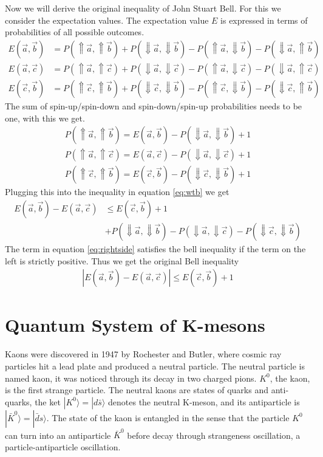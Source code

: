 \documentclass[a4paper]{article}
\begin{document}
Now we will derive the original inequality of John Stuart Bell\cite{bell}.
For this we consider the expectation values. The expectation value $E$ is expressed
in terms of probabilities of all possible outcomes.
\begin{align}
    E(\vec{a}, \vec{b}) &= P(\Uparrow \vec{a}, \Uparrow \vec{b}) + P(\Downarrow
    \vec{a}, \Downarrow \vec{b}) -P(\Uparrow \vec{a}, \Downarrow \vec{b})
    -P(\Downarrow \vec{a}, \Uparrow \vec{b})\\
    E(\vec{a}, \vec{c}) &= P(\Uparrow \vec{a}, \Uparrow \vec{c}) + P(\Downarrow
    \vec{a}, \Downarrow \vec{c}) -P(\Uparrow \vec{a}, \Downarrow \vec{c})
    -P(\Downarrow \vec{a}, \Uparrow \vec{c})\\
    E(\vec{c}, \vec{b}) &= P(\Uparrow \vec{c}, \Uparrow \vec{b}) + P(\Downarrow
    \vec{c}, \Downarrow \vec{b}) -P(\Uparrow \vec{c}, \Downarrow \vec{b})
    -P(\Downarrow \vec{c}, \Uparrow \vec{b})
\end{align}
The sum of spin-up/spin-down and spin-down/spin-up probabilities needs to be
one, with this we get.
\begin{align}
    P(\Uparrow \vec{a}, \Uparrow \vec{b}) = E(\vec{a}, \vec{b}) - P(\Downarrow
    \vec{a}, \Downarrow \vec{b}) + 1\\
    P(\Uparrow \vec{a}, \Uparrow \vec{c}) = E(\vec{a}, \vec{c}) - P(\Downarrow
    \vec{a}, \Downarrow \vec{c}) + 1\\
    P(\Uparrow \vec{c}, \Uparrow \vec{b}) = E(\vec{c}, \vec{b}) - P(\Downarrow
    \vec{c}, \Downarrow \vec{b}) + 1
\end{align}
Plugging this into the inequality in equation \ref{eq:wtb} we get
\begin{align}
    E(\vec{a}, \vec{b}) - E(\vec{a}, \vec{c}) &\leq E(\vec{c}, \vec{b}) + 1\\
    & + P(\Downarrow \vec{a}, \Downarrow \vec{b}) -P(\Downarrow \vec{a},
    \Downarrow \vec{c}) -P(\Downarrow \vec{c}, \Downarrow \vec{b})
    \label{eq:rightside}
\end{align}
The term in equation \ref{eq:rightside} satisfies the bell inequality if the
term on the left is strictly positive. Thus we get the original Bell inequality
\begin{align}
    |E(\vec{a}, \vec{b}) - E(\vec{a}, \vec{c})| \leq E(\vec{c}, \vec{b}) + 1
\end{align}
\section{Quantum System of K-mesons}
Kaons were discovered in 1947 by Rochester and Butler, where cosmic ray
particles hit a lead plate and produced a neutral particle. The neutral
particle is named kaon, it was noticed through its decay in two charged
pions. $K^0$, the kaon, is the first strange particle.
The neutral kaons are states of quarks and anti-quarks, the ket
$|K^0\rangle = |d\bar{s}\rangle$ denotes the neutral K-meson, and its
antiparticle is $|\bar{K}^0\rangle = |\bar{d}s\rangle$. The state of the kaon
is entangled in the sense that the particle $K^0$ can turn into an antiparticle
$\bar{K}^0$ before decay through strangeness oscillation, a particle-antiparticle oscillation.
\end{document}

